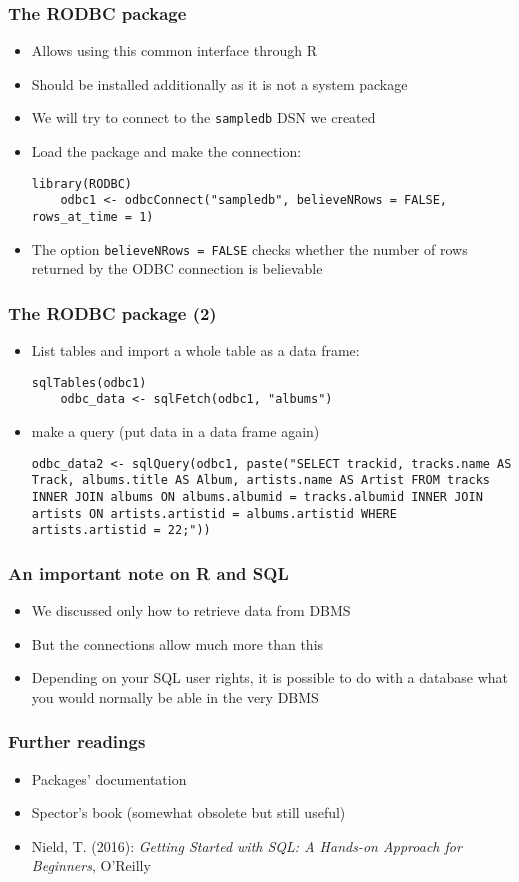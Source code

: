 \documentclass[10pt]{beamer}
\theoremstyle{definition}
\begin{document}
\begin{frame}[fragile]
\frametitle{The \textbf{RODBC} package}
\begin{itemize}
	\item Allows using this common interface through R
	\item Should be installed additionally as it is not a system package
	\item We will try to connect to the \texttt{sampledb} DSN we created
	\item Load the package and make the connection:
	\begin{lstlisting}[style = rstyle, breaklines]
	library(RODBC)
	odbc1 <- odbcConnect("sampledb", believeNRows = FALSE, rows_at_time = 1)
	\end{lstlisting}
	\item The option \texttt{believeNRows = FALSE} checks whether the number of rows returned by the ODBC connection is believable
	
\end{itemize}
\end{frame}

\begin{frame}[fragile]
\frametitle{The \textbf{RODBC} package (2)}
\begin{itemize}
	\item List tables and import a whole table as a data frame:
	\begin{lstlisting}[style = rstyle, breaklines]
	sqlTables(odbc1)
	odbc_data <- sqlFetch(odbc1, "albums")
	\end{lstlisting}
	\item make a query (put data in a data frame again)
	\begin{lstlisting}[style = rstyle, breaklines]
	odbc_data2 <- sqlQuery(odbc1, paste("SELECT	trackid, tracks.name AS Track, albums.title AS Album, artists.name AS Artist FROM tracks INNER JOIN albums ON albums.albumid = tracks.albumid INNER JOIN artists ON artists.artistid = albums.artistid WHERE artists.artistid = 22;"))
	\end{lstlisting}
\end{itemize}
\end{frame}

\begin{frame}[fragile]
\frametitle{An important note on R and SQL}
\begin{itemize}
	\item We discussed only how to retrieve data from DBMS
	\item But the connections allow much more than this
	\item Depending on your SQL user rights, it is possible to do with a database what you would normally be able in the very DBMS
\end{itemize}
\end{frame}

\begin{frame}[fragile]
\frametitle{Further readings}
\begin{itemize}
	\item Packages' documentation
	\item Spector's book (somewhat obsolete but still useful)
	\item Nield, T. (2016): \emph{Getting Started with SQL: A Hands-on Approach for Beginners}, O'Reilly
\end{itemize}
\end{frame}
\end{document}
